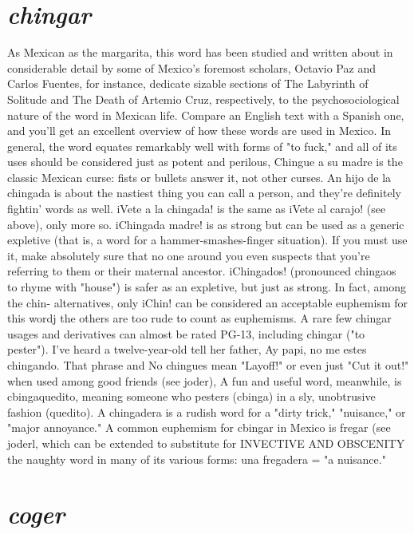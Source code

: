 \documentclass[14pt,a4paper,oneside]{memoir}
\begin{document}
\section{\emph{chingar}}

As Mexican as the margarita, this word has been studied and
written about in considerable detail by some of Mexico's foremost
scholars, Octavio Paz and Carlos Fuentes, for instance, dedicate sizable
sections of The Labyrinth of Solitude and The Death of Artemio Cruz,
respectively, to the psychosociological nature of the word in Mexican
life. Compare an English text with a Spanish one, and you'll get an excellent overview of how these words are used in Mexico.
In general, the word equates remarkably well with forms of "to
fuck," and all of its uses should be considered just as potent and perilous, Chingue a su madre is the classic Mexican curse: fists or bullets
answer it, not other curses. An hijo de la chingada is about the nastiest thing you can call a person, and they're definitely fightin' words as
well. iVete a la chingada! is the same as iVete al carajo! (see above),
only more so. iChingada madre! is as strong but can be used as a generic expletive (that is, a word for a hammer-smashes-finger situation).
If you must use it, make absolutely sure that no one around you even
suspects that you're referring to them or their maternal ancestor. iChingados! (pronounced chingaos to rhyme with "house") is safer as an expletive, but just as strong. In fact, among the chin- alternatives, only
iChin! can be considered an acceptable euphemism for this wordj the
others are too rude to count as euphemisms.
A rare few chingar usages and derivatives can almost be rated
PG-13, including chingar ("to pester"). I've heard a twelve-year-old tell
her father, Ay papi, no me estes chingando. That phrase and No chingues mean "Layoff!" or even just "Cut it out!" when used among good
friends (see joder), A fun and useful word, meanwhile, is cbingaquedito, meaning someone who pesters (cbinga) in a sly, unobtrusive fashion (quedito). A chingadera is a rudish word for a "dirty trick," "nuisance," or "major annoyance." A common euphemism for cbingar in
Mexico is fregar (see joderl, which can be extended to substitute for
INVECTIVE AND OBSCENITY
the naughty word in many of its various forms: una fregadera = "a
nuisance."

\section{\emph{coger}}
\end{document}
